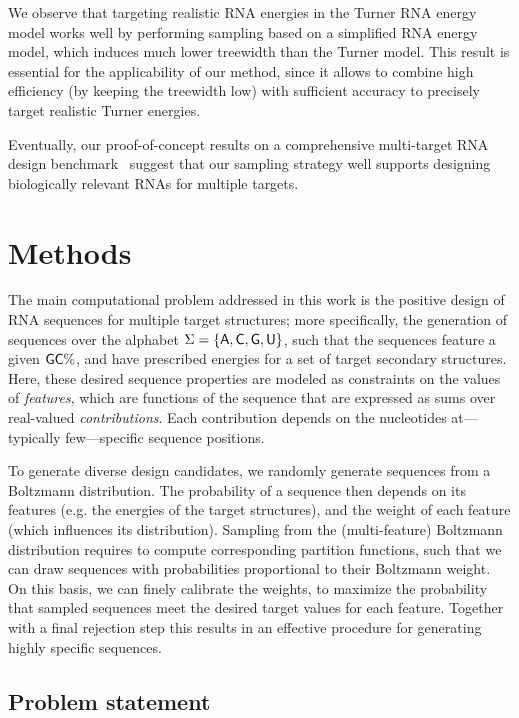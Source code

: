 \documentclass[]{bmcart}
\newcommand{\Def}[1]{\emph{#1}}
\newcommand{\Nuc}[1]{{\sf #1}}
\newcommand{\Ab}{\Nuc{A}}
\newcommand{\Cb}{\Nuc{C}}
\newcommand{\Gb}{\Nuc{G}}
\newcommand{\Ub}{\Nuc{U}}
\newcommand{\GCb}{\Gb\Cb}
\newcommand{\citep}[1]{\cite{#1}}
\newcommand{\revised}[1]{{\color{red} #1}}
\begin{document}
We observe that
targeting realistic RNA energies in the
Turner RNA energy model
works well by performing sampling based on \revised{a simplified RNA energy model, which induces much lower treewidth than the Turner model}. This result is \revised{essential for the applicability of our method, since it allows to combine high efficiency (by keeping the treewidth low) with sufficient accuracy to precisely target realistic Turner energies.} 

\revised{Eventually, our proof-of-concept results 
 on a comprehensive multi-target RNA design benchmark~\citep{Taneda2015} 
  suggest that our sampling strategy well supports designing biologically relevant
RNAs for multiple targets.} 

\section*{Methods}
\revised{The main computational problem addressed in this work is the positive design of RNA sequences for multiple target structures; more specifically, the generation of sequences over the alphabet $\Sigma=\{\Ab,\Cb,\Gb,\Ub\}$, such that the sequences feature a given $\GCb\%$, and have prescribed energies for a set of target secondary structures.
Here, these desired sequence properties are modeled as constraints on the values of \Def{features}, which are functions of the sequence that are expressed as sums over real-valued \Def{contributions}. Each contribution depends on the nucleotides at---typically few---specific sequence positions.}

\revised{To generate diverse design candidates, we randomly generate sequences from a Boltzmann distribution. The probability of a sequence then depends on its features (e.g. the energies of the target structures), and the weight of each feature (which influences its distribution). Sampling from the (multi-feature) Boltzmann distribution requires to compute corresponding partition functions, such that we can draw sequences with probabilities proportional to their Boltzmann weight. 
On this basis, we can finely calibrate the weights, to maximize the probability that sampled sequences meet the desired target values for each feature. Together with a final rejection step this results in an effective procedure for generating highly specific sequences.}


 
\subsection*{Problem statement}
\label{sec:problem-statement}
\end{document}
